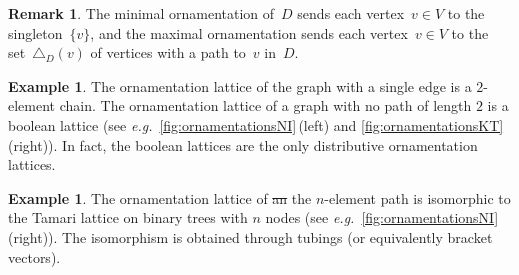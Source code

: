 \documentclass{amsart}
\theoremstyle{definition}
\newtheorem{example}[theorem]{Example}
\newtheorem{remark}[theorem]{Remark}
\renewcommand{\c}[1]{\mathcal{#1}} %
\newcommand{\ssm}{\smallsetminus} %
\newcommand{\eg}{\textit{e.g.}~} %
\newcommand{\jose}[1]{{\color{red}#1}}
\DeclareMathOperator{\Orn}{\c{O}}  %
\begin{document}
\begin{remark}
The minimal ornamentation of~$D$ sends each vertex~$v \in V$ to the singleton~$\{v\}$, and the maximal ornamentation sends each vertex~$v \in V$ to the set~$\triangle_D(v)$ of vertices with a path to~$v$ in~$D$.
\end{remark}

\begin{example}
The ornamentation lattice of the graph with a single edge is a $2$-element chain.
The ornamentation lattice of a graph with no path of length $2$ is a boolean lattice (see \eg \cref{fig:ornamentationsNI}\,(left) and \ref{fig:ornamentationsKT}\,(right)).
In fact, the boolean lattices are the only distributive ornamentation lattices.
\end{example}

\begin{example}
The ornamentation lattice of \jose{\sout{an} the} $n$-element path is isomorphic to the Tamari lattice on binary trees with $n$ nodes (see \eg \cref{fig:ornamentationsNI}\,(right)).
The isomorphism is obtained through tubings (or equivalently bracket vectors).
\end{example}

\end{document}
